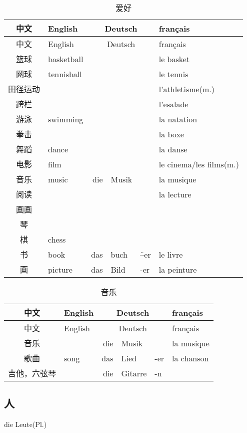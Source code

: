 \documentclass[12pt,A4paper,oneside,reqno]{amsart}
\numberwithin{equation}{section}
\theoremstyle{plain}
\theoremstyle{plain}
\theoremstyle{plain}
\numberwithin{equation}{section}
\theoremstyle{remark}
\begin{document}
\begin{longtable}{c|l|rll|l}
	\hline
	中文	&	English	&\multicolumn{3}{c|}{Deutsch} &	français  	\\
	\hline
	\endhead
	\hline
	中文	&	English	&\multicolumn{3}{c|}{Deutsch} &	français  	\\
	\hline
	\endfirsthead	
	\hline
	\endfoot
	\hline	
	\caption{爱好}
	\endlastfoot				
篮球	&	basketball	&		&		&		&	le basket	\\
网球	&	tennisball	&		&		&		&	le tennis	\\
田径运动	&		&		&		&		&	l'athletisme(m.)	\\
跨栏	&		&		&		&		&	l'esalade	\\
游泳	&	swimming	&		&		&		&	la natation	\\
拳击	&		&		&		&		&	la boxe 	\\
舞蹈	&	dance	&		&		&		&	la danse	\\
电影	&	film	&		&		&		&	le cinema/les films(m.)	\\
音乐	&	music	&	die	&	Musik	&		&	la musique	\\
阅读	&		&		&		&		&	la lecture	\\
画画	&		&		&		&		&		\\
\hline											
琴	&		&		&		&		&		\\
棋	&	chess	&		&		&		&		\\
书	&	book	&	das	&	buch	&	\"{--}er	&	le livre	\\
画	&	picture	&	das	&	Bild	&	-er	&	la peinture 	\\



	
\end{longtable}
\begin{longtable}{c|l|rll|l}
	\hline
	中文	&	English	&\multicolumn{3}{c|}{Deutsch} &	français  	\\
	\hline
	\endhead
	\hline
	中文	&	English	&\multicolumn{3}{c|}{Deutsch} &	français  	\\
	\hline
	\endfirsthead	
	\hline
	\endfoot
	\hline	
	\caption{音乐}
	\endlastfoot				
音乐	&		&	die	&	Musik	&		&	la musique	\\
歌曲	&	song	&	das	&	Lied	&	-er	&	la chanson	\\
吉他，六弦琴	&		&	die	&	Gitarre	&	-n	&		\\


	
\end{longtable}

	\subsection{人}\hspace{1cm} die Leute(Pl.)
	
\end{document}
